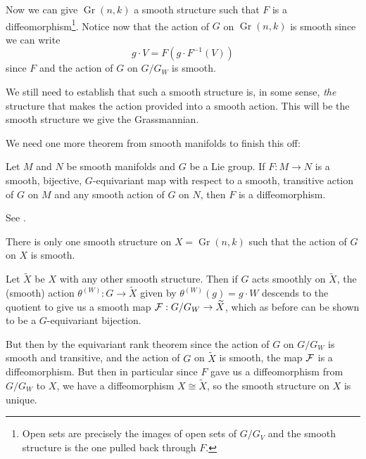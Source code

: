 \documentclass[12pt]{article}
\DeclareMathOperator{\Gr}{Gr}
\begin{document}
\noindent Now we can give $\Gr(n,k)$ a smooth structure such that $F$ is a diffeomorphism\footnote{Open sets are precisely the images of open sets of $G/G_V$ and the smooth 
structure is the one pulled back through $F$.}. Notice now that the action of $G$ on $\Gr(n,k)$ is smooth since we can write 
\[g\cdot V=F(g\cdot F^{-1}(V))\]
since $F$ and the action of $G$ on $G/G_W$ is smooth.

We still need to establish that such a smooth structure is, in some sense, \textit{the} structure that makes 
the action provided into a smooth action. This will be the smooth structure we give the Grassmannian.

We need one more theorem from smooth manifolds to finish this off:
\begin{thm}
	Let $M$ and $N$ be smooth manifolds and $G$ be a Lie group. If $F:M\to N$ is a smooth, bijective, $G$-equivariant map with respect to 
	a smooth, transitive action of $G$ on $M$ and any smooth action of $G$ on $N$, then $F$ is a diffeomorphism.
\end{thm}
\begin{prf}
	See \cite[thm 7.25]{LeeISM}.
\end{prf}
\begin{lem}
	There is only one smooth structure on $X=\Gr(n,k)$ such that the action of $G$ on $X$ is smooth.
\end{lem}
\begin{prf}
	Let $\tilde X$ be $X$ with any other smooth structure. Then if $G$ acts smoothly on $\tilde X$, the (smooth) action $\theta^{(W)}:G\to \tilde X$ given by $\theta^{(W)}(g)=g\cdot W$ 
	descends to the quotient to give us a smooth map $\mathcal{F}:G/G_W\to \widetilde{X}$, which as before can be shown to be a $G$-equivariant bijection.

	But then by the equivariant rank theorem since the action of $G$ on $G/G_W$ is smooth and transitive, and the action of $G$ on $\tilde X$ is smooth,
	the map $\mathcal{F}$ is a diffeomorphism. But then in particular since $F$ gave us a diffeomorphism from $G/G_W$ to $X$, 
	we have a diffeomorphism $X\cong \tilde X$, so the smooth structure on $X$ is unique.
\end{prf}
\end{document}
